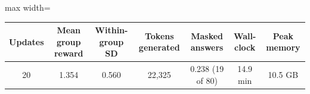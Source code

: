\begin{adjustbox}{max width=\linewidth}
\begin{tabular}{ccccccc}
\toprule
Updates & Mean group reward & Within-group SD & Tokens generated & Masked answers & Wall-clock & Peak memory \\
\midrule
20 & 1.354 & 0.560 & 22,325 & 0.238 (19 of 80) & 14.9 min & 10.5 GB \\
\bottomrule
\end{tabular}
\end{adjustbox}
